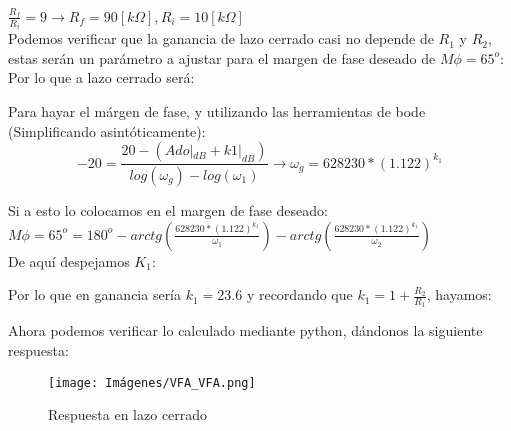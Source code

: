 $\frac{R_f}{R_i} = 9 \xrightarrow{} R_f = 90 [k\Omega], R_i = 10 [k\Omega]$\\

Podemos verificar que la ganancia de lazo cerrado casi no depende de $R_1$ y $R_2$, estas serán un parámetro a ajustar para el margen de fase deseado de $M\phi = 65^o$:\\

Por lo que a lazo cerrado será:\\

\begin{center}
\end{center}

Para hayar el márgen de fase, y utilizando las herramientas de bode (Simplificando asintóticamente):\\

\[-20 = \frac{20 - (Ado|_{dB} + k1|_{dB})}{log(\omega_g) - log(\omega_1)} \xrightarrow{} \omega_g = 628230*(1.122)^{k_{1}}\]

Si a esto lo colocamos en el margen de fase deseado:\\

$M\phi = 65^o = 180^o - arctg(\frac{628230*(1.122)^{k_{1}}}{\omega_1}) - arctg(\frac{628230*(1.122)^{k_{1}}}{\omega_2})$\\

De aquí despejamos $K_1$:\\

\begin{center}
\end{center}

Por lo que en ganancia sería $k_1 = 23.6$ y recordando que $k_1 = 1 +\frac{R_2}{R_1}$, hayamos:\\

\begin{center}
\end{center}
\begin{center}
\end{center}

Ahora podemos verificar lo calculado mediante python, dándonos la siguiente respuesta:\\

\begin{figure}[ht]
    \centering
    \texttt{[image: Imágenes/VFA\_VFA.png]}
    \caption{Respuesta en lazo cerrado}
\end{figure}

